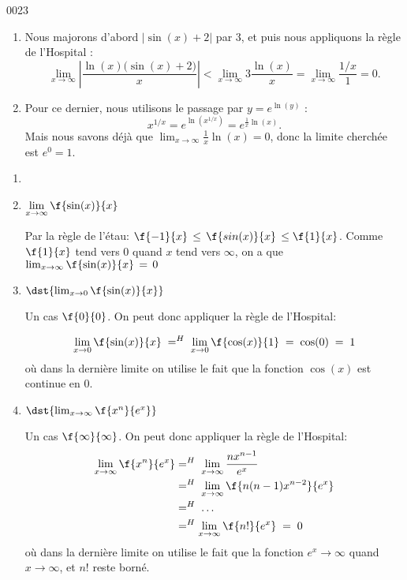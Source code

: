 \begin{corrige}{0023}
\begin{enumerate}
\item
Nous majorons d'abord $|\sin(x)+2|$ par $3$, et puis nous appliquons la règle de l'Hospital :
\begin{equation}
	\lim_{x\to\infty}\left| \frac{ \ln(x)\big( \sin(x)+2 \big) }{ x } \right|<\lim_{x\to\infty}3\frac{ \ln(x) }{ x }=\lim_{x\to\infty}\frac{ 1/x }{ 1 }=0.
\end{equation}

\item
Pour ce dernier, nous utilisons le passage par $y= e^{\ln(y)}$ :
\begin{equation}
	x^{1/x}= e^{\ln(x^{1/x})}= e^{\frac{1}{ x }\ln(x)}.
\end{equation}
Mais nous savons déjà que $\lim_{x\to\infty}\frac{1}{ x }\ln(x)=0$, donc la limite cherchée est $ e^{0}=1$.

\end{enumerate}

\begin{alternative}

	\begin{enumerate}

		\item

		\item $\displaystyle{ \lim_{x\rightarrow \infty}\f{\sin(x)}{x}}$\hs

		Par la règle de l'étau: $ \f{-1}{x} \, \leq\, \f{sin(x)}{x} \,\leq \f{1}{x}$. Comme $\f{1}{x}$ tend vers $0$ quand $x$ tend vers $\infty$, on a que $ \lim_{x\rightarrow\infty}\f{\sin(x)}{x} \, =\,0$

		\item $ \dst{\lim_{x\rightarrow 0}\f{\sin(x)}{x}}$\hs

		Un cas $\f{0}{0}$. On peut donc appliquer la règle de l'Hospital:

		 \[\lim_{x\rightarrow 0}\f{\sin(x)}{x} \; =^{H}\; \lim_{x\rightarrow 0}\f{\cos(x)}{1}\;=\; \cos(0)\;=\;1\] o\`{u} dans la dernière limite on utilise le fait que la fonction $\cos(x)$ est continue en $0$.
		 
		 
		 \item $ \dst{\lim_{x\rightarrow \infty }\f{x^n}{e^x}}$\hs
		 
		Un cas $\f{\infty}{\infty}$. On peut donc appliquer la règle de l'Hospital:
	\begin{equation}
	\begin{aligned}[]
		\lim_{x\rightarrow \infty}\f{x^n}{e^x}&=^H\;  \lim_{x\rightarrow \infty}\frac{nx^{n-1}}{e^x}\\
			&=^H\;  \lim_{x\rightarrow \infty}\f{n(n-1)x^{n-2}}{e^x}\\
			&=^H\; \ldots\\
			&=^H\lim_{x\rightarrow \infty}\f{n!}{e^x}\;=\;0
	\end{aligned}
\end{equation}	 
		 où dans la dernière limite on utilise le fait que la fonction $e^x \rightarrow  \infty$ quand $x\rightarrow  \infty$, et $n!$ reste borné.
		 

\end{enumerate}
\end{alternative}
\end{corrige}

